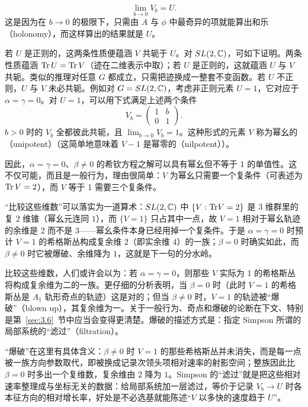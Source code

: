\setcounter{equation}{13}
\begin{equation}\label{eq:3.14}
  \lim_{b\to 0}V_b=U.
\end{equation}
这是因为在 $b\to 0$ 的极限下，只需由 $A$ 与 $\phi$ 中最奇异的项就能算出和乐（holonomy），而这样算出的结果就是 $U$。

若 $U$ 是正则的，这两条性质便蕴涵 $V$ 共轭于 $U$。对 $SL(2,{\mathbb{C}})$，可如下证明。两条性质蕴涵
${\rm Tr} \,U={\rm Tr}\, V$（迹在二维表示中取）；若 $U$ 是正则的，这就蕴涵 $U$ 与 $V$
共轭。类似的推理对任意 $G$ 都成立，只需把迹换成一整套不变函数。若 $U$ 不正则，$U$ 与 $V$ 未必共轭。例如对
$G=SL(2,{\mathbb{C}})$，考虑非正则元素 $U=1$，它对应于 $\alpha=\gamma=0$。对 $U=1$，可以用下式满足上述两个条件
\setcounter{equation}{14}
\begin{equation}\label{eq:3.15}
  V_b=\left(\begin{matrix}1& b\\ 0 &
1\end{matrix}\right).
\end{equation}
  $b>0$ 时的 $V_b$ 全都彼此共轭，且
$\lim_{b\to 0}V_b=1$。这种形式的元素 $V$ 称为幂幺的（unipotent）（这简单地意味着 $V-1$ 是幂零的（nilpotent））。

因此，$\alpha=\gamma=0$、$\beta\not=0$ 的希钦方程之解可以具有幂幺但不等于 1 的单值性。这不仅可能，而且是一般行为，理由很简单：$V$ 为幂幺只需要一个复条件（可表述为
${\rm Tr}\,V=2$），而 $V$ 等于 1 需要三个复条件。

\begin{yizhu}[含糊点拨]
“比较这些维数”可以落实为一道算术：$SL(2,{\mathbb{C}})$ 中 $\{V:{\rm Tr} V=2\}$ 是 $3$ 维群里的复 $2$ 维锥（幂幺元连同 $1$），而 $\{V=1\}$ 只占其中一点，故 $V=1$ 相对于幂幺轨迹的余维是 $2$ 而不是 $3$——幂幺条件本身已经用掉一个复条件。于是 $\alpha=\gamma=0$ 时预计 $V=1$ 的希格斯丛构成复余维 $2$（即实余维 $4$）的一族；$\beta=0$ 时确实如此，而 $\beta\not=0$ 时它被爆破、余维降为 $1$，这就是下一句的分水岭。
\end{yizhu}比较这些维数，人们或许会以为：若
$\alpha=\gamma=0$，则那些 $V$ 实际为 1 的希格斯丛将构成复余维为二的一族。更仔细的分析表明，当 $\beta=0$ 时（此时 $V=1$ 的希格斯丛是 $A_1$ 轨形奇点的轨迹）这是对的；但当 $\beta\not=0$ 时，$V=1$ 的轨迹被“爆破”（blown up），其复余维为一。关于一般行为、奇点和爆破的论断在下文、特别是第~\ref{sec:3.6}~节中应当会变得更清楚。爆破的描述方式是：指定 Simpson \cite{ref22} 所谓的局部系统的“滤过”（filtration）。

\begin{yizhu}[含糊点拨]
“爆破”在这里有具体含义：$\beta\not=0$ 时 $V=1$ 的那些希格斯丛并未消失，而是每一点被一族方向参数取代，即被换成记录次领头项相对速率的射影空间；整族因此比 $\beta=0$ 时多出一个复维数，复余维由 $2$ 降为 $1$。Simpson 的“滤过”就是把这些相对速率整理成与坐标无关的数据：给局部系统加一层滤过，等价于记录 $V_b\to U$ 时各本征方向的相对增长率，好处是不必选基就能陈述“$V$ 以多快的速度趋于 $U$”。
\end{yizhu}

